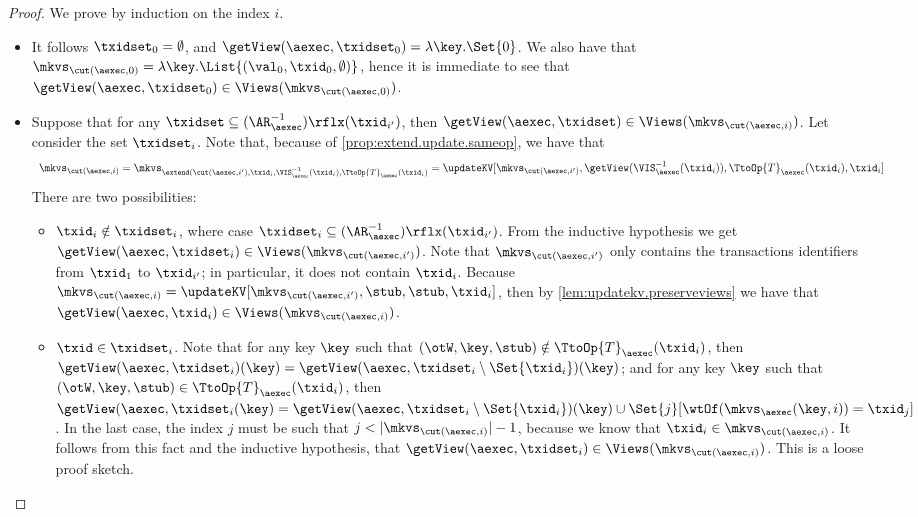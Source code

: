 \begin{proof}
We prove by induction on the index $i$. 
\begin{itemize}
\item {} It follows $\txidset_{0} = \emptyset$, and $\getView(\aexec, \txidset_{0}) = \lambda \key. \Set{0}$. 
We also have that $\mkvs_{\cut(\aexec, 0)} = \lambda \key. \List{(\val_0, \txid_{0}, \emptyset)}$, hence 
it is immediate to see that $\getView(\aexec, \txidset_{0}) \in \Views(\mkvs_{\cut(\aexec, 0)})$.

\item {}
Suppose that for any $\txidset \subseteq (\AR_{\aexec}^{-1})\rflx(\txid_{i'})$, 
then $\getView(\aexec, \txidset) \in \Views(\mkvs_{\cut(\aexec, i)})$. 
Let consider the set $\txidset_{i}$.
Note that, because of \cref{prop:extend.update.sameop}, we have that
\[
\begin{array}{l}
\mkvs_{\cut(\aexec, i)} =
\mkvs_{\extend(\cut(\aexec, i'), \txid_{i}, \VIS^{-1}_{\aexec}(\txid_{i}), \TtoOp{T}_{\aexec}(\txid_{i})} 
= \updateKV[\mkvs_{\cut(\aexec, i')}, \getView(\VIS^{-1}_{\aexec}(\txid_{i})), \TtoOp{T}_{\aexec}(\txid_{i}), \txid_{i}]
\end{array}
\]
There are two possibilities:
\begin{itemize}
\item $\txid_{i} \notin \txidset_{i}$, where case $\txidset_{i} \subseteq (\AR_{\aexec}^{-1})\rflx(\txid_{i'})$.
From the inductive hypothesis we get $\getView(\aexec, \txidset_{i}) \in \Views(\mkvs_{\cut(\aexec, i')})$. 
Note that $\mkvs_{\cut(\aexec, i')}$ only contains the transactions identifiers from $\txid_{1}$ to $\txid_{i'}$;
in particular, it does not contain $\txid_{i}$. 
Because $\mkvs_{\cut(\aexec, i)} = \updateKV[\mkvs_{\cut(\aexec, i')}, \stub, \stub, \txid_{i}]$, 
then by \cref{lem:updatekv.preserveviews} we have that $\getView(\aexec, \txid_{i}) \in \Views(\mkvs_{\cut(\aexec, i)})$.

\item $\txid \in \txidset_{i}$. Note that for any key $\key$ such that 
$(\otW, \key, \stub) \notin \TtoOp{T}_{\aexec}(\txid_{i})$, then 
$\getView(\aexec, \txidset_{i})(\key) = \getView(\aexec, \txidset_{i} \setminus \Set{\txid_{i}})(\key)$; 
and for any key $\key$ such that $(\otW, \key, \stub) \in \TtoOp{T}_{\aexec}(\txid_{i})$, 
then $\getView(\aexec, \txidset_{i}(\key) = \getView(\aexec, \txidset_{i} \setminus \Set{\txid_{i}})(\key) 
\cup \Set{j}[\wtOf(\mkvs_{\aexec}(\key, i)) = \txid_{j}]$. 
In the last case, the index $j$ must be such that $j < \lvert \mkvs_{\cut(\aexec, i)} \rvert - 1$, 
because we know that $\txid_{i} \in \mkvs_{\cut(\aexec, i)}$. 
It follows from this fact and the inductive hypothesis, 
that $\getView(\aexec, \txidset_{i}) \in \Views(\mkvs_{\cut(\aexec, i)})$.
\ac{This is a loose proof sketch.} 
\end{itemize}
\end{itemize}
\end{proof}

